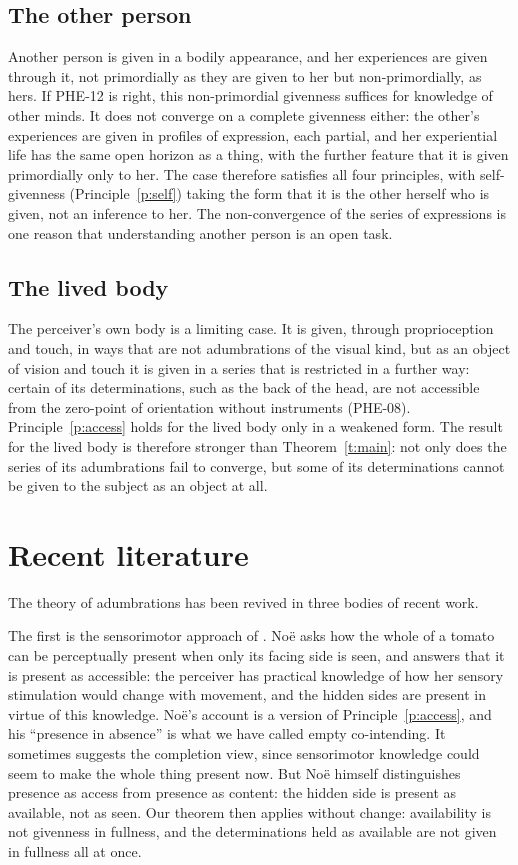 \documentclass{situationist-preprint}
\begin{document}
\subsection{The other person}

Another person is given in a bodily appearance, and her experiences are given through it, not primordially as they are given to her but non-primordially, as hers. If PHE-12 is right, this non-primordial givenness suffices for knowledge of other minds. It does not converge on a complete givenness either: the other's experiences are given in profiles of expression, each partial, and her experiential life has the same open horizon as a thing, with the further feature that it is given primordially only to her. The case therefore satisfies all four principles, with self-givenness (Principle~\ref{p:self}) taking the form that it is the other herself who is given, not an inference to her. The non-convergence of the series of expressions is one reason that understanding another person is an open task.

\subsection{The lived body}

The perceiver's own body is a limiting case. It is given, through proprioception and touch, in ways that are not adumbrations of the visual kind, but as an object of vision and touch it is given in a series that is restricted in a further way: certain of its determinations, such as the back of the head, are not accessible from the zero-point of orientation without instruments (PHE-08). Principle~\ref{p:access} holds for the lived body only in a weakened form. The result for the lived body is therefore stronger than Theorem~\ref{t:main}: not only does the series of its adumbrations fail to converge, but some of its determinations cannot be given to the subject as an object at all.

\section{Recent literature}\label{s:recent}

The theory of adumbrations has been revived in three bodies of recent work.

The first is the sensorimotor approach of \citet{Noe2004}. Noë asks how the whole of a tomato can be perceptually present when only its facing side is seen, and answers that it is present as accessible: the perceiver has practical knowledge of how her sensory stimulation would change with movement, and the hidden sides are present in virtue of this knowledge. Noë's account is a version of Principle~\ref{p:access}, and his \enquote{presence in absence} is what we have called empty co-intending. It sometimes suggests the completion view, since sensorimotor knowledge could seem to make the whole thing present now. But Noë himself distinguishes presence as access from presence as content: the hidden side is present as available, not as seen. Our theorem then applies without change: availability is not givenness in fullness, and the determinations held as available are not given in fullness all at once.
\end{document}
